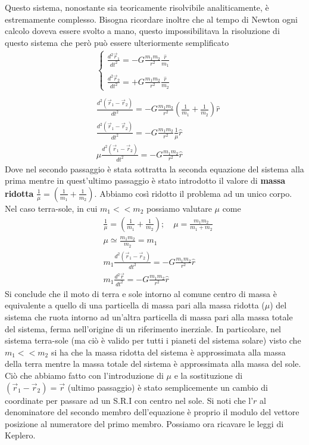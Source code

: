 \documentclass[10pt,a4paper]{article}
\begin{document}
Questo sistema, nonostante sia teoricamente risolvibile analiticamente, è estremamente complesso. Bisogna ricordare inoltre che al tempo di Newton ogni calcolo doveva essere svolto a mano, questo impossibilitava la risoluzione di questo sistema che però può essere ulteriormente semplificato
\begin{align*}
	&\begin{cases}
		\frac{d^2\vec{r}_1}{dt^2} = -G\frac{m_1m_2}{r^2}\frac{\hat{r}}{m_1}\\\\
		\frac{d^2\vec{r}_2}{dt^2} = +G\frac{m_1m_2}{r^2}\frac{\hat{r}}{m_2}
	\end{cases}\\\\
&\frac{d^2(\vec{r}_1-\vec{r}_2)}{dt^2} = -G\frac{m_1m_2}{r^2}(\frac{1}{m_1}+\frac{1}{m_2})\hat{r}\\
&\frac{d^2(\vec{r}_1-\vec{r}_2)}{dt^2} = -G\frac{m_1m_2}{r^2}\frac{1}{\mu}\hat{r}\\
&\mu\frac{d^2(\vec{r}_1-\vec{r}_2)}{dt^2} = -G\frac{m_1m_2}{r^2}\hat{r}
\end{align*}
Dove nel secondo passaggio è stata sottratta la seconda equazione del sistema alla prima mentre in quest'ultimo passaggio è stato introdotto il valore di \textbf{massa ridotta} $\frac{1}{\mu} = (\frac{1}{m_1}+\frac{1}{m_2})$. Abbiamo così ridotto il problema ad un unico corpo. Nel caso terra-sole, in cui $m_1<<m_2$ possiamo valutare $\mu$ come
\begin{align*}
	&\frac{1}{\mu} = (\frac{1}{m_1}+\frac{1}{m_2}); \quad \mu = \frac{m_1m_2}{m_1+m_2}\\
	&\mu \simeq \frac{m_1m_2}{m_2} = m_1\\
	&m_1\frac{d^2(\vec{r}_1-\vec{r}_2)}{dt^2} = -G\frac{m_1m_2}{r^2}\hat{r}\\
	&m_1\frac{d^2\vec{r}}{dt^2} = -G\frac{m_1m_2}{r^2}\hat{r}
\end{align*}
Si conclude che il moto di terra e sole intorno al comune centro di massa è equivalente a quello di una particella di massa pari alla massa ridotta ($\mu$) del sistema che ruota intorno ad un’altra particella di massa pari alla massa totale del sistema, ferma nell’origine di un riferimento inerziale. In particolare, nel sistema terra-sole (ma ciò è valido per tutti i pianeti del sistema solare) visto che $m_1<<m_2$ si ha che la massa ridotta del sistema è approssimata alla massa della terra mentre la massa totale del sistema è approssimata alla massa del sole. Ciò che abbiamo fatto con l'introduzione di $\mu$ e la sostituzione di $(\vec{r}_1-\vec{r}_2) = \vec{r}$ (ultimo passaggio) è stato semplicemente un cambio di coordinate per passare ad un S.R.I con centro nel sole. Si noti che l'$r$ al denominatore del secondo membro dell'equazione è proprio il modulo del vettore posizione al numeratore del primo membro. Possiamo ora ricavare le leggi di Keplero.
\end{document}
